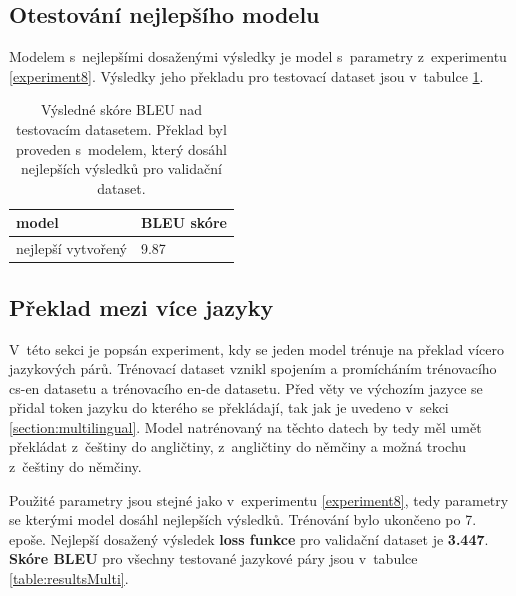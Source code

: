 \subsection{Otestování nejlepšího modelu} \label{experimentBestModel}
Modelem s~nejlepšími dosaženými výsledky je model s~parametry z~experimentu \ref{experiment8}. Výsledky jeho překladu pro testovací dataset jsou v~tabulce \ref{table:bestResults}.

\begin{table}[H]
    \begin{center}
        \begin{tabular}{ll}
          \toprule
          model & BLEU skóre \\
          \midrule
          nejlepší vytvořený & 9.87 \\
          \bottomrule
        \end{tabular}
    \end{center}
	\caption{Výsledné skóre BLEU nad testovacím datasetem. Překlad byl proveden s~modelem, který dosáhl nejlepších výsledků pro validační dataset.}
	\label{table:bestResults}
\end{table}


\subsection{Překlad mezi více jazyky} \label{experimentMultiLingual}
V~této sekci je popsán experiment, kdy se jeden model trénuje na překlad vícero jazykových párů. Trénovací dataset vznikl spojením a promícháním trénovacího cs-en datasetu a trénovacího en-de datasetu. Před věty ve výchozím jazyce se přidal token jazyku do kterého se překládají, tak jak je uvedeno v~sekci \ref{section:multilingual}. Model natrénovaný na těchto datech by tedy měl umět překládat z~češtiny do angličtiny, z~angličtiny do němčiny a možná trochu z~češtiny do němčiny.

Použité parametry jsou stejné jako v~experimentu \ref{experiment8}, tedy parametry se kterými model dosáhl nejlepších výsledků. Trénování bylo ukončeno po 7. epoše. Nejlepší dosažený výsledek \textbf{loss funkce} pro validační dataset je \textbf{3.447}. \textbf{Skóre BLEU} pro všechny testované jazykové páry jsou v~tabulce \ref{table:resultsMulti}.

